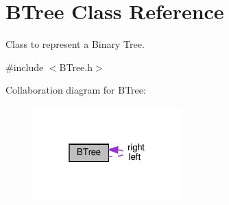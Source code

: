 \hypertarget{classBTree}{}\section{B\+Tree Class Reference}
\label{classBTree}


Class to represent a Binary Tree.  




{\ttfamily \#include $<$B\+Tree.\+h$>$}



Collaboration diagram for B\+Tree\+:\nopagebreak
\begin{figure}[H]
\begin{center}
\leavevmode
\includegraphics[width=163pt]{classBTree__coll__graph}
\end{center}
\end{figure}
